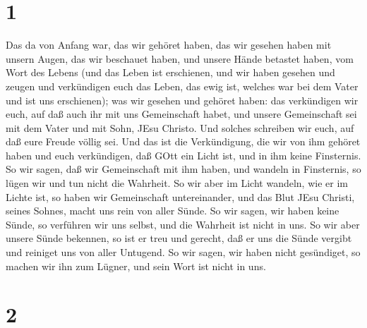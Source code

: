 \hypertarget{section}{%
\section{1}\label{section}}

 Das da von Anfang war, das wir gehöret haben, das wir
gesehen haben mit unsern Augen, das wir beschauet haben, und unsere
Hände betastet haben, vom Wort des Lebens  (und das Leben
ist erschienen, und wir haben gesehen und zeugen und verkündigen euch
das Leben, das ewig ist, welches war bei dem Vater und ist uns
erschienen);  was wir gesehen und gehöret haben: das
verkündigen wir euch, auf daß auch ihr mit uns Gemeinschaft habet, und
unsere Gemeinschaft sei mit dem Vater und mit Sohn, JEsu Christo.
 Und solches schreiben wir euch, auf daß eure Freude völlig
sei.  Und das ist die Verkündigung, die wir von ihm gehöret
haben und euch verkündigen, daß GOtt ein Licht ist, und in ihm keine
Finsternis.  So wir sagen, daß wir Gemeinschaft mit ihm
haben, und wandeln in Finsternis, so lügen wir und tun nicht die
Wahrheit.  So wir aber im Licht wandeln, wie er im Lichte
ist, so haben wir Gemeinschaft untereinander, und das Blut JEsu Christi,
seines Sohnes, macht uns rein von aller Sünde.  So wir
sagen, wir haben keine Sünde, so verführen wir uns selbst, und die
Wahrheit ist nicht in uns.  So wir aber unsere Sünde
bekennen, so ist er treu und gerecht, daß er uns die Sünde vergibt und
reiniget uns von aller Untugend.  So wir sagen, wir haben
nicht gesündiget, so machen wir ihn zum Lügner, und sein Wort ist nicht
in uns.

\hypertarget{section-1}{%
\section{2}\label{section-1}}

